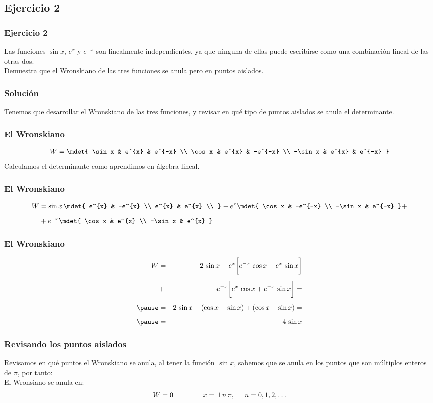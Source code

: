 \subsection{Ejercicio 2}
\begin{frame}
\frametitle{Ejercicio 2}
Las funciones $\sin x$, $e^{x}$ y $e^{-x}$ son linealmente independientes, ya que ninguna de ellas puede escribirse como una combinación lineal de las otras dos.
\\
\bigskip
\pause
Demuestra que el Wronskiano de las tres funciones se anula pero en puntos aislados.
\end{frame}
\begin{frame}
\frametitle{Solución}
Tenemos que desarrollar el Wronskiano de las tres funciones, y revisar en qué tipo de puntos aislados se anula el determinante.
\end{frame}
\begin{frame}
\frametitle{El Wronskiano}
\begin{align*}
W = \mdet{
\sin x & e^{x} & e^{-x} \\
\cos x & e^{x} & -e^{-x} \\
-\sin x & e^{x} & e^{-x}
}
\end{align*}
\pause
Calculamos el determinante como aprendimos en álgebra lineal.
\end{frame}
\begin{frame}
\frametitle{El Wronskiano}
\begin{align*}
W &= \sin x \, \mdet{
e^{x} & -e^{x} \\
e^{x} & e^{x} \\
} - e^{x} \mdet{
\cos x & -e^{-x} \\
-\sin x & e^{-x}
} + \\[0.5em]
&+e^{-x} \mdet{
\cos x & e^{x} \\
-\sin x & e^{x}
}
\end{align*}
\end{frame}
\begin{frame}
\frametitle{El Wronskiano}
\begin{eqnarray*}
W &=& 2 \, \sin x - e^{x} \bigg[ e^{-x} \, \cos x - e^{x} \, \sin x \bigg] \\[0.5em]
&+& e^{-x} \bigg[ e^{x} \, \cos x + e^{-x} \, \sin x \bigg] = \\[0.5em] \pause
&=& 2 \, \sin x - (\cos x -\sin x) + (\cos x + \sin x) = \\[0.5em] \pause
&=& 4 \, \sin x
\end{eqnarray*}
\end{frame}
\begin{frame}
\frametitle{Revisando los puntos aislados}
Revisamos en qué puntos el Wronskiano se anula, al tener la función $\sin x$, sabemos que se anula en los puntos que son múltiplos enteros de $\pi$, por tanto:
\\
\bigskip
\pause
El Wronsiano se anula en:
\begin{align*}
W = 0 \hspace{1.5cm} x = \pm n \, \pi, \hspace{0.5cm} n = 0, 1, 2, \ldots
\end{align*}
\end{frame}
